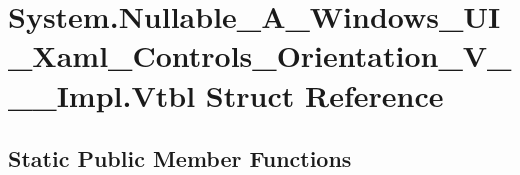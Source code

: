 \hypertarget{struct_system_1_1_nullable___a___windows___u_i___xaml___controls___orientation___v_______impl_1_1_vtbl}{}\section{System.\+Nullable\+\_\+\+A\+\_\+\+Windows\+\_\+\+U\+I\+\_\+\+Xaml\+\_\+\+Controls\+\_\+\+Orientation\+\_\+\+V\+\_\+\+\_\+\+\_\+\+Impl.\+Vtbl Struct Reference}
\label{struct_system_1_1_nullable___a___windows___u_i___xaml___controls___orientation___v_______impl_1_1_vtbl}
\subsection*{Static Public Member Functions}

